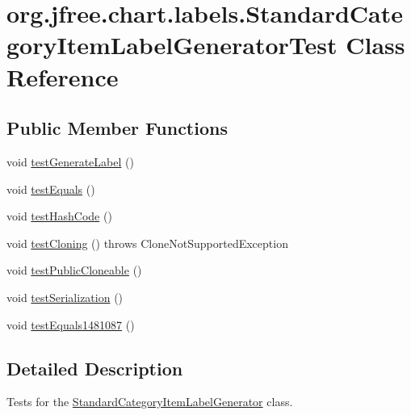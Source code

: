 \hypertarget{classorg_1_1jfree_1_1chart_1_1labels_1_1_standard_category_item_label_generator_test}{}\section{org.\+jfree.\+chart.\+labels.\+Standard\+Category\+Item\+Label\+Generator\+Test Class Reference}
\label{classorg_1_1jfree_1_1chart_1_1labels_1_1_standard_category_item_label_generator_test}
\subsection*{Public Member Functions}
\begin{DoxyCompactItemize}
\item 
void \mbox{\hyperlink{classorg_1_1jfree_1_1chart_1_1labels_1_1_standard_category_item_label_generator_test_a4ea03ae7b4f0eb4edf668ebd0b55a83f}{test\+Generate\+Label}} ()
\item 
void \mbox{\hyperlink{classorg_1_1jfree_1_1chart_1_1labels_1_1_standard_category_item_label_generator_test_a3fdd41049b9d61b62d41f061a916b01f}{test\+Equals}} ()
\item 
void \mbox{\hyperlink{classorg_1_1jfree_1_1chart_1_1labels_1_1_standard_category_item_label_generator_test_ae6f8e36149597d0e319e319fd04136c2}{test\+Hash\+Code}} ()
\item 
void \mbox{\hyperlink{classorg_1_1jfree_1_1chart_1_1labels_1_1_standard_category_item_label_generator_test_a7d5c1d385745f115031b288def1022b9}{test\+Cloning}} ()  throws Clone\+Not\+Supported\+Exception 
\item 
void \mbox{\hyperlink{classorg_1_1jfree_1_1chart_1_1labels_1_1_standard_category_item_label_generator_test_af9cdf5b23a187190bb02eba024b3da41}{test\+Public\+Cloneable}} ()
\item 
void \mbox{\hyperlink{classorg_1_1jfree_1_1chart_1_1labels_1_1_standard_category_item_label_generator_test_a8250192ccb3d8ae06f17e1acbb3b3162}{test\+Serialization}} ()
\item 
void \mbox{\hyperlink{classorg_1_1jfree_1_1chart_1_1labels_1_1_standard_category_item_label_generator_test_a14f2f5bc9dbfbd64633afbf038747e64}{test\+Equals1481087}} ()
\end{DoxyCompactItemize}


\subsection{Detailed Description}
Tests for the \mbox{\hyperlink{classorg_1_1jfree_1_1chart_1_1labels_1_1_standard_category_item_label_generator}{Standard\+Category\+Item\+Label\+Generator}} class. 

